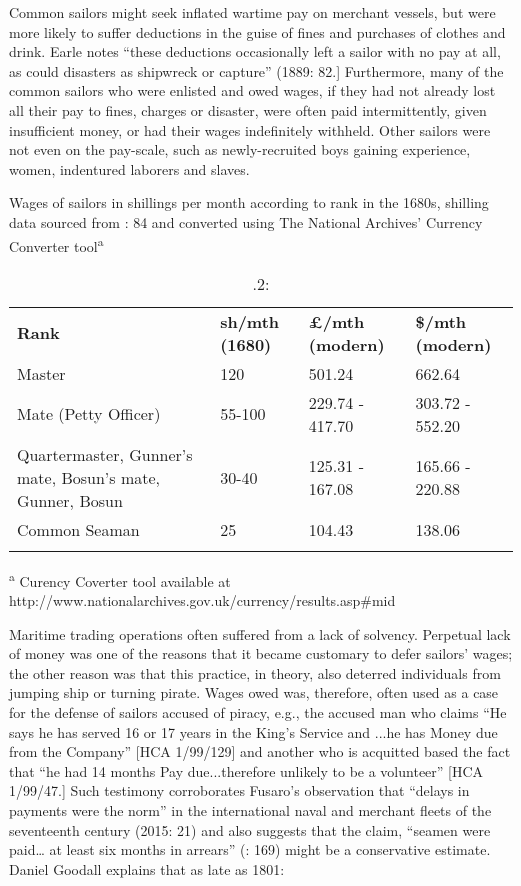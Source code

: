 Common sailors might seek inflated wartime pay on merchant vessels, but were more likely to suffer deductions in the guise of fines and purchases of clothes and drink. Earle notes “these deductions occasionally left a sailor with no pay at all, as could disasters as shipwreck or capture” (1889: 82.] Furthermore, many of the common sailors who were enlisted and owed wages, if they had not already lost all their pay to fines, charges or disaster, were often paid intermittently, given insufficient money, or had their wages indefinitely withheld. Other sailors were not even on the pay-scale, such as newly-recruited boys gaining experience, women, indentured laborers and slaves. 

\begin{table}
\caption{\label{tab:key:3}.2:} Wages of sailors in shillings per month according to rank in the 1680s, shilling data sourced from \citealt{Earle1998}: 84 and converted using The National Archives’ Currency Converter tool\textsuperscript{a}

\begin{tabularx}{\textwidth}{XXXX}
\lsptoprule

\textbf{Rank} & \textbf{sh/mth} \textbf{(1680)} & \textbf{£/mth} \textbf{(modern)} & \textbf{\$/mth} \textbf{(modern)}\\
Master & 120 & 501.24 & 662.64\\
Mate (Petty Officer) & 55-100 & 229.74 - 417.70 & 303.72 - 552.20\\
Quartermaster, Gunner’s mate, Bosun’s mate, Gunner, Bosun & 30-40 & 125.31 - 167.08 & 165.66 - 220.88\\
Common Seaman & 25 & 104.43 & 138.06\\
\lspbottomrule
\end{tabularx}\end{table}
\textsuperscript{a} Curency Coverter tool available at http://www.nationalarchives.gov.uk/currency/results.asp\#mid

Maritime trading operations often suffered from a lack of solvency. Perpetual lack of money was one of the reasons that it became customary to defer sailors’ wages; the other reason was that this practice, in theory, also deterred individuals from jumping ship or turning pirate. Wages owed was, therefore, often used as a case for the defense of sailors accused of piracy, e.g., the accused man who claims “He says he has served 16 or 17 years in the King’s Service and ...he has Money due from the Company” [HCA 1/99/129] and another who is acquitted based the fact that “he had 14 months Pay due...therefore unlikely to be a volunteer” [HCA 1/99/47.] Such testimony corroborates Fusaro’s observation that “delays in payments were the norm” in the international naval and merchant fleets of the seventeenth century (2015: 21) and also suggests that the claim, “seamen were paid… at least six months in arrears” (\citealt{AdkinsAdkins2008}: 169) might be a conservative estimate. Daniel Goodall explains that as late as 1801:

